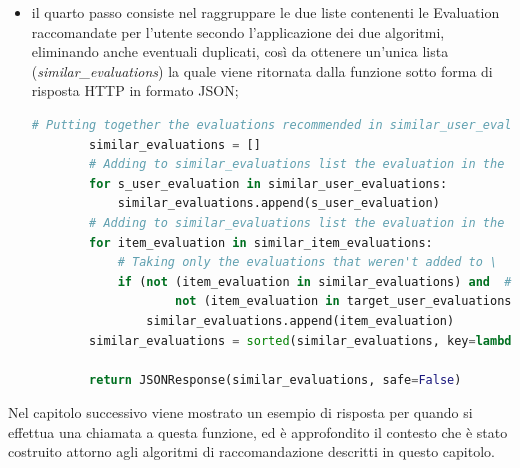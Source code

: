 \begin{itemize}
\begin{lstlisting}[language=Python, label=lst:CF_Hybrid_Evaluation_4]
                # Taking only the evaluations that have: different other_id (excluding the target evaluation
                # in the recommendation) and same parent_id and the evaluations that weren't added to 'similar_item_evaluations'
                # list or to 'similar_user_evaluations' or to 'target_user_evaluations'
                if ((t_user_evaluation['other_id'] != item_evaluation['other_id']) and # Evaluations must have different 'id'
                        (t_user_evaluation['parent_id'] == item_evaluation['parent_id']) and # Evaluations must have the same 'parent_id'
                        # Evaluation in all_other_evals list mustn't be already added to \
                        not (item_evaluation in similar_item_evaluations) and # the 'similar_item_evaluations' list,
                        not (item_evaluation in similar_user_evaluations) and # the 'similar_user_evaluations' list or
                        not (item_evaluation in target_user_evaluations)): # the 'target_user_evaluations' list
                    similar_item_evaluations.append(item_evaluation)
    \end{lstlisting} 
    \item il quarto passo consiste nel raggruppare le due liste contenenti le Evaluation raccomandate per l'utente secondo l'applicazione dei 
    due algoritmi, eliminando anche eventuali duplicati, così da ottenere un'unica lista (\textit{similar\_evaluations}) la quale viene ritornata dalla 
    funzione sotto forma di risposta HTTP in formato JSON;
    \begin{lstlisting}[language=Python, label=lst:CF_Hybrid_Evaluation_5]
        # Putting together the evaluations recommended in similar_user_evaluations list and similar_item_evaluations list
        similar_evaluations = []
        # Adding to similar_evaluations list the evaluation in the similar_user_evaluations list
        for s_user_evaluation in similar_user_evaluations:
            similar_evaluations.append(s_user_evaluation)
        # Adding to similar_evaluations list the evaluation in the similar_item_evaluations list
        for item_evaluation in similar_item_evaluations:
            # Taking only the evaluations that weren't added to \
            if (not (item_evaluation in similar_evaluations) and  # the 'similar_evaluations' list or
                    not (item_evaluation in target_user_evaluations)):  # the 'target_user_evaluations' list
                similar_evaluations.append(item_evaluation)
        similar_evaluations = sorted(similar_evaluations, key=lambda i: i['other_id'])
        
        return JSONResponse(similar_evaluations, safe=False)
    \end{lstlisting} 
\end{itemize}
Nel capitolo successivo viene mostrato un esempio di risposta per quando si effettua una chiamata a questa funzione, ed è approfondito il contesto che 
è stato costruito attorno agli algoritmi di raccomandazione descritti in questo capitolo.

